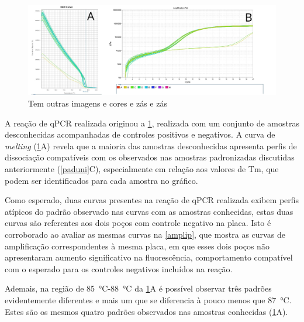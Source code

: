 \begin{figure}
        \centering
        \includegraphics[width=.4\textwidth]{fig/prancheta_test_PCR}
        \caption{Tem outras imagens e cores e zás e zás}
        \label{tstuni}
\end{figure}

A reação de qPCR realizada originou a \cref{tstuni}, realizada com um conjunto
de amostras desconhecidas acompanhadas de controles positivos e negativos. A
curva de \textit{melting} (\cref{tstuni}A) revela que a maioria das amostras
desconhecidas apresenta perfis de dissociação compatíveis com os observados nas
amostras padronizadas discutidas anteriormente (\cref{paduni}C),
especialmente em relação aos valores de Tm, que podem ser 
identificados para cada amostra no gráfico.

Como esperado, duas curvas presentes na reação de qPCR realizada exibem perfis
atípicos do padrão observado nas curvas com as amostras conhecidas, estas duas
curvas são referentes aos dois poços com controle negativo na placa. Isto é
corroborado ao avaliar as mesmas curvas na \cref{amplip}, que mostra as curvas
de amplificação correspondentes à mesma placa, em que esses dois poços não
apresentaram aumento significativo na fluorescência, comportamento compatível
com o esperado para os controles negativos incluídos na reação.

Ademais, na região de \qty{85}{\celsius}-\qty{88}{\celsius} da \cref{tstuni}A é
possível observar três padrões evidentemente diferentes e mais um que se
diferencia à pouco menos que \qty{87}{\celsius}. Estes são os mesmos quatro
padrões observados nas amostras conhecidas (\cref{tstuni}A).
